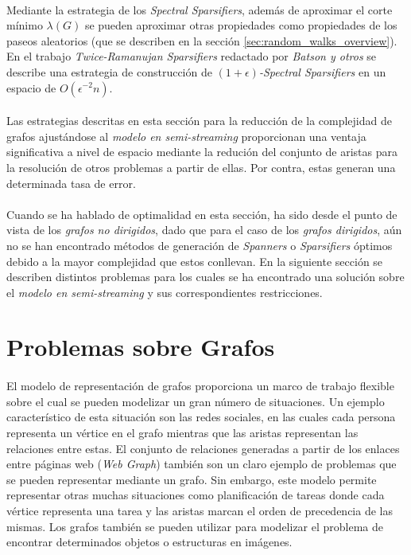 \documentclass{subfiles}
\begin{document}
        \paragraph{}
        Mediante la estrategia de los \emph{Spectral Sparsifiers}, además de aproximar el corte mínimo $\lambda(G)$ se pueden aproximar otras propiedades como propiedades de los paseos aleatorios (que se describen en la sección \ref{sec:random_walks_overview}). En el trabajo \emph{Twice-Ramanujan Sparsifiers} \cite{batson2012twice} redactado por \emph{Batson y otros} se describe una estrategia de construcción de \emph{$(1 +\epsilon)$-Spectral Sparsifiers} en un espacio de $O(\epsilon^{-2}n)$.

      \paragraph{}
      Las estrategias descritas en esta sección para la reducción de la complejidad de grafos ajustándose al \emph{modelo en semi-streaming} proporcionan una ventaja significativa a nivel de espacio mediante la redución del conjunto de aristas para la resolución de otros problemas a partir de ellas. Por contra, estas generan una determinada tasa de error.

      \paragraph{}
      Cuando se ha hablado de optimalidad en esta sección, ha sido desde el punto de vista de los \emph{grafos no dirigidos}, dado que para el caso de los \emph{grafos dirigidos}, aún no se han encontrado métodos de generación de \emph{Spanners} o \emph{Sparsifiers} óptimos debido a la mayor complejidad que estos conllevan. En la siguiente sección se describen distintos problemas para los cuales se ha encontrado una solución sobre el \emph{modelo en semi-streaming} y sus correspondientes restricciones.

    \section{Problemas sobre Grafos}
    \label{sec:graph_problems}

      \paragraph{}
      El modelo de representación de grafos proporciona un marco de trabajo flexible sobre el cual se pueden modelizar un gran número de situaciones. Un ejemplo característico de esta situación son las redes sociales, en las cuales cada persona representa un vértice en el grafo mientras que las aristas representan las relaciones entre estas. El conjunto de relaciones generadas a partir de los enlaces entre páginas web (\emph{Web Graph}) también son un claro ejemplo de problemas que se pueden representar mediante un grafo. Sin embargo, este modelo permite representar otras muchas situaciones como planificación de tareas donde cada vértice representa una tarea y las aristas marcan el orden de precedencia de las mismas. Los grafos también se pueden utilizar para modelizar el problema de encontrar determinados objetos o estructuras en imágenes.
\end{document}
